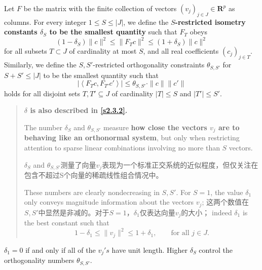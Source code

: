 \begin{definition}[\textbf{\textcolor[rgb]{1,0,0}{Restricted Isometry Constants}}]
    \label{def5.1.1}
    Let $F$ be the matrix with the finite collection of vectors $(v_j)_{j \in J}\in \mathbf{R}^p$ as columns. For every integer $1 \leq S \leq |J|$, we define the \textbf{\textcolor[rgb]{1,0,0}{$S$-restricted isometry constants $\delta_S$ to be the smallest quantity}} such that $F_T$ obeys
    \begin{equation}
        (1- \delta_S)\|c\|^2 \leq \|F_T c\|^2 \leq (1+\delta_S)\|c\|^2 
        \label{eq5.1.7}
    \end{equation}
    for all subsets $T \subset J$ of cardinality at most $S$, and all real coefficients $(c_j)_{j \in T}$. Similarly, we define the $S,S'$-restricted orthogonality constraints $\theta_{S,S'}$ for $S+S' \leq |J|$ to be the smallest quantity such that
    \begin{equation}
        |\left< F_T c, F_{T'} c' \right>| \leq \theta_{S,S'} \cdot \|c\| \|c'\|
        \label{eq5.1.8}
    \end{equation}
    holds for all disjoint sets $T,T' \subseteq J$ of cardinality $|T| \leq S$ and $|T'| \leq S'$.
\end{definition}

\begin{quote}
    \label{define:delta}

    \textbf{\textcolor[rgb]{1,0,0}{$\delta$ is also described in \cref{s2.3.2}.}}

    The number $\delta_S$ and $\theta_{S,S'}$ measure \textbf{\textcolor[rgb]{1,0,0}{how close the vectors $v_j$ are to behaving like an orthonormal system}}, but only when restricting attention to sparse linear combinations involving no more than $S$ vectors.

    $\delta_S$ and $\theta_{S,S'}$测量了向量$v_j$表现为一个标准正交系统的近似程度，但仅关注在包含不超过S个向量的稀疏线性组合情况中。

    These numbers are clearly nondecreasing in $S,S'$. For $S=1$, the value $\delta_1$ only conveys magnitude information about the vectors $v_j$; 
    这两个数值在$S,S'$中显然是非减的。对于$S=1$，$\delta_1$仅表达向量$v_j$的大小；
    indeed $\delta_1$ is the best constant such that
    \begin{equation}
        1-\delta_1 \leq \|v_j\|^2 \leq 1+\delta_1, \qquad \mbox{for all $j \in J$}.
        \label{eq5.1.9}
    \end{equation}
\end{quote}
$\delta_1 = 0$ if and only if all of the $v_j's$ have unit length. Higher $\delta_S$ control the orthogonality numbers $\theta_{S,S'}$.

